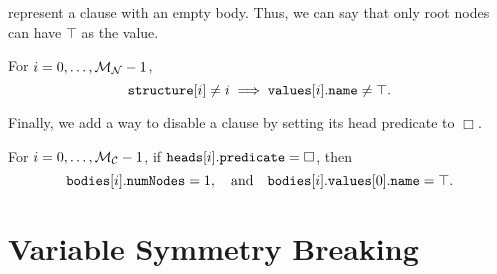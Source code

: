 represent a clause with an empty body. Thus, we can say that only root nodes can
have $\top$ as the value.
\begin{constraint}
  For $i = 0, \dots, \mathcal{M}_{\mathcal{N}}{} - 1$,
  \[
    \texttt{\textup{structure}}[i] \ne i \implies
    \texttt{\textup{values}}[i].\texttt{\textup{name}} \ne \top.
  \]
\end{constraint}
Finally, we add a way to disable a clause by setting its head predicate to
$\Box$.
\begin{constraint}
  For $i = 0, \dots, \mathcal{M}_{\mathcal{C}}{} - 1$, if
  $\texttt{\textup{heads}}[i].\texttt{\textup{predicate}} = \Box$, then
  \[
    \texttt{\textup{bodies}}[i].\texttt{\textup{numNodes}} = 1, \quad \text{and}
    \quad \texttt{\textup{bodies}}[i].\texttt{\textup{values}}[0].\texttt{\textup{name}} = \top.
  \]
\end{constraint}

\section{Variable Symmetry Breaking} \label{sec:variable_symmetry}

